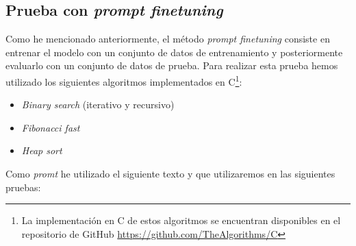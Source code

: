 \subsection{Prueba con \textit{prompt finetuning}}
\label{subsec:prueba_prompt_finetuning}


Como he mencionado anteriormente, el método \textit{prompt finetuning} consiste en entrenar
el modelo con un conjunto de datos de entrenamiento y posteriormente evaluarlo con un conjunto
de datos de prueba. Para realizar esta prueba hemos utilizado los siguientes algoritmos implementados
en C\footnote{La implementación en C de estos algoritmos se encuentran disponibles en el repositorio de GitHub
\url{https://github.com/TheAlgorithms/C}}:

\begin{itemize}
    \item \textit{Binary search} (iterativo y recursivo)
    \item \textit{Fibonacci fast}
    \item \textit{Heap sort}
\end{itemize}

Como \textit{promt} he utilizado el siguiente texto y que utilizaremos en las siguientes
pruebas:

